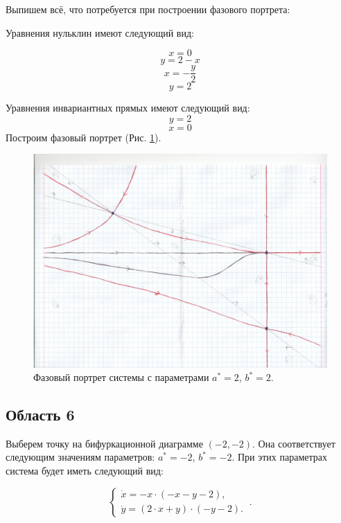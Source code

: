 Выпишем всё, что потребуется при построении фазового портрета:

Уравнения нульклин имеют следующий вид: 

$$x=0$$
$$y=2 - x$$
$$x=- \frac{y}{2}$$
$$y=2$$


Уравнения инвариантных прямых имеют следующий вид: 
$$y = 2$$
$$x = 0$$
Построим фазовый портрет (Рис. \ref{fig:phportr5}).

\begin{figure}[h]
	
	\includegraphics[width=\textwidth]{phptr/(2,2).jpg}
	\centering
	\caption{\label{fig:phportr5} Фазовый портрет системы с параметрами $a^\ast = 2$, $b^\ast = 2$.}
	
\end{figure}

\subsection{Область 6}

Выберем точку на бифуркационной диаграмме $(-2, -2)$. Она соответствует следующим значениям параметров:  $a^\ast = -2$, $b^\ast = -2$. При этих параметрах система будет иметь следующий вид: 

$$
\left \lbrace 
\begin{matrix} 
	\dot{x} = -x \cdot (-x - y - 2), \\
	\dot{y} = (2 \cdot x + y) \cdot (-y - 2). \
\end{matrix} 
\right . .$$

